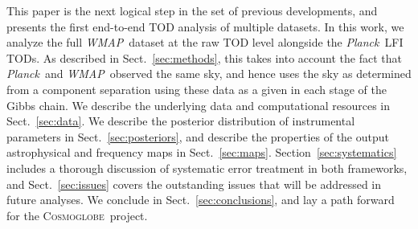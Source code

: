 \documentclass[twocolumn]{../../common/aa}
\def\WMAP{\emph{WMAP}}
\def\Planck{\emph{Planck}}
\newcommand{\cosmoglobe}{\textsc{Cosmoglobe}}
\begin{document}
This paper is the next logical step in the set of previous developments, and presents the first end-to-end TOD analysis of multiple datasets. In this work, we analyze the full \WMAP\ dataset at the raw TOD level alongside the \Planck\ LFI TODs. As described in Sect.~\ref{sec:methods}, this takes into account the fact that \Planck\ and \WMAP\ observed the same sky, and hence uses the sky as determined from a component separation using these data as a given in each stage of the Gibbs chain. We describe the underlying data and computational resources in  Sect.~\ref{sec:data}. We describe the posterior distribution of instrumental parameters in Sect.~\ref{sec:posteriors},  and describe the properties of the output astrophysical and frequency maps in Sect.~\ref{sec:maps}. %
Section~\ref{sec:systematics} includes a thorough discussion of systematic error treatment in both frameworks, and Sect.~\ref{sec:issues} covers the outstanding issues that will be addressed in future analyses. We conclude in Sect.~\ref{sec:conclusions}, and lay a path forward for the \cosmoglobe\ project.


% 
% 
\end{document}
